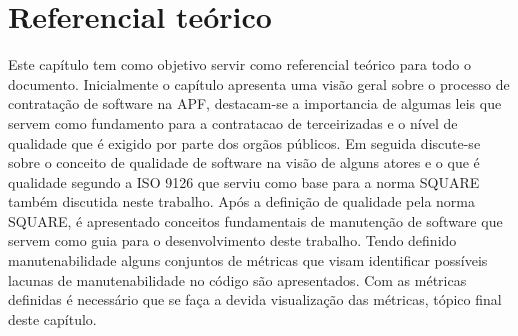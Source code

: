 
\chapter[Referencial Teórico]{Referencial teórico}
	
	Este capítulo tem como objetivo servir como referencial teórico para todo o documento. Inicialmente o capítulo apresenta uma visão geral sobre o processo de contratação de software na APF, destacam-se a importancia de algumas leis que servem como fundamento para a contratacao de terceirizadas e o nível de qualidade que é exigido por parte dos orgãos públicos. Em seguida discute-se sobre o conceito de qualidade de software na visão de alguns atores e o que é qualidade segundo a ISO 9126 que serviu como base para a norma SQUARE também discutida neste trabalho. Após a definição de qualidade pela norma SQUARE, é apresentado conceitos fundamentais de manutenção de software que servem como guia para o desenvolvimento deste trabalho. Tendo definido manutenabilidade alguns conjuntos de métricas que visam identificar possíveis lacunas de manutenabilidade no código são apresentados. Com as métricas definidas é necessário que se faça a devida visualização das métricas, tópico final deste capítulo.
	
